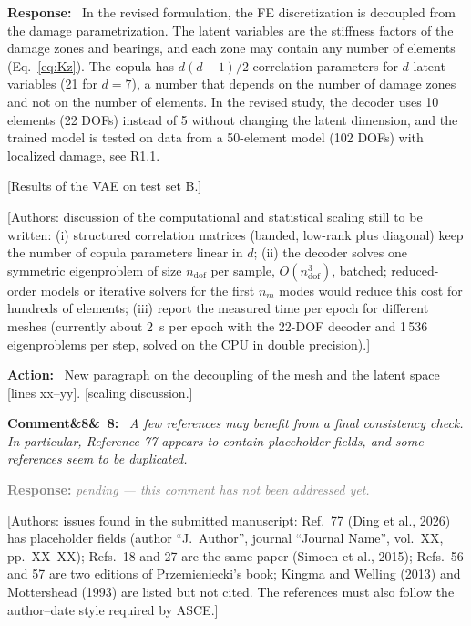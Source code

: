 \documentclass[11pt]{article}
\newenvironment{rcomment}[1]{\par\bigskip\noindent\textbf{Comment\ifx&#1&\else\ #1\fi:}\ \itshape}{\par}
\newenvironment{response}{\par\smallskip\noindent\color{resp}\textbf{Response:}\ }{\par}
\newenvironment{action}{\par\smallskip\noindent\color{resp}\textbf{Action:}\ }{\par}
\newcommand{\pending}{\par\smallskip\noindent\textcolor{gray}{\textbf{Response:} \textit{pending --- this comment
has not been addressed yet.}}\par}
\newcommand{\authornote}[1]{\textcolor{note}{\textsf{[Authors: #1]}}}
\newcommand{\tbd}[1]{\textcolor{note}{\textsf{[#1]}}}
\newcommand{\lines}[1]{\tbd{lines #1}}
\begin{document}
\begin{response}
In the revised formulation, the FE discretization is decoupled from the damage parametrization. The latent variables
are the stiffness factors of the damage zones and bearings, and each zone may contain any number of elements
(Eq.~\eqref{eq:Kz}). The copula has $d(d-1)/2$ correlation parameters for $d$ latent variables (21 for $d=7$), a number
that depends on the number of damage zones and not on the number of elements. In the revised study, the decoder uses 10
elements (22 DOFs) instead of 5 without changing the latent dimension, and the trained model is tested on data from a
50-element model (102 DOFs) with localized damage, see R1.1.

\tbd{Results of the VAE on test set B.}
\end{response}
\authornote{discussion of the computational and statistical scaling still to be written: (i) structured correlation
matrices (banded, low-rank plus diagonal) keep the number of copula parameters linear in $d$; (ii) the decoder solves
one symmetric eigenproblem of size $n_{\mathrm{dof}}$ per sample, $O(n_{\mathrm{dof}}^3)$, batched; reduced-order
models or iterative solvers for the first $n_m$ modes would reduce this cost for hundreds of elements; (iii) report the
measured time per epoch for different meshes (currently about 2~s per epoch with the 22-DOF decoder and 1\,536
eigenproblems per step, solved on the CPU in double precision).}

\begin{action}
New paragraph on the decoupling of the mesh and the latent space \lines{xx--yy}. \tbd{scaling discussion.}
\end{action}

\begin{rcomment}{8}
A few references may benefit from a final consistency check. In particular, Reference 77 appears to contain placeholder
fields, and some references seem to be duplicated.
\end{rcomment}
\pending
\authornote{issues found in the submitted manuscript: Ref.~77 (Ding et al., 2026) has placeholder fields (author
``J.~Author'', journal ``Journal Name'', vol.~XX, pp.~XX--XX); Refs.~18 and 27 are the same paper (Simoen et al., 2015);
Refs.~56 and 57 are two editions of Przemieniecki's book; Kingma and Welling (2013) and Mottershead (1993) are listed but
not cited. The references must also follow the author--date style required by ASCE.}
\end{document}
